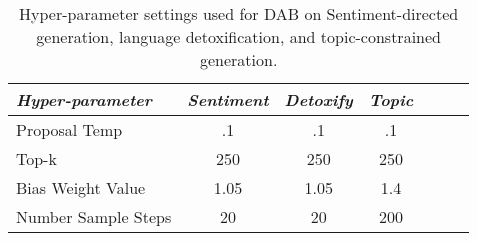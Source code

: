 \begin{table}[h]
\caption{Hyper-parameter settings used for DAB on Sentiment-directed generation, language detoxification, and topic-constrained generation.}
\centering
\label{appndx:tab:exp-hyperparam}
\begin{tabular}{l|cccccl}\toprule
     \textit{Hyper-parameter} & \textit{Sentiment} & \textit{Detoxify} & \textit{Topic} \\ \midrule 
Proposal Temp & .1 & .1 & .1\\ 
Top-k & 250 & 250 & 250 \\
Bias Weight Value & 1.05 & 1.05 & 1.4 \\
Number Sample Steps & 20 & 20 & 200 \\ 
\bottomrule
\end{tabular}
\end{table} 